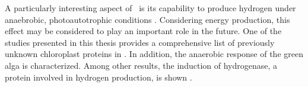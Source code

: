 A particularly interesting aspect of \cre~is its capability to produce
hydrogen under anaebrobic, photoautotrophic conditions \citep{Greenbaum1982}.
Considering energy production, this effect may be considered to play an 
important role in the future.
One of the studies presented in this thesis provides a comprehensive list of
previously unknown chloroplast proteins in \cre.
In addition, the anaerobic response of the green alga is characterized. 
Among other results, the induction of hydrogenase, a protein involved in 
hydrogen production, is shown \citep{Terashima2010}.

% 
% 
% 
